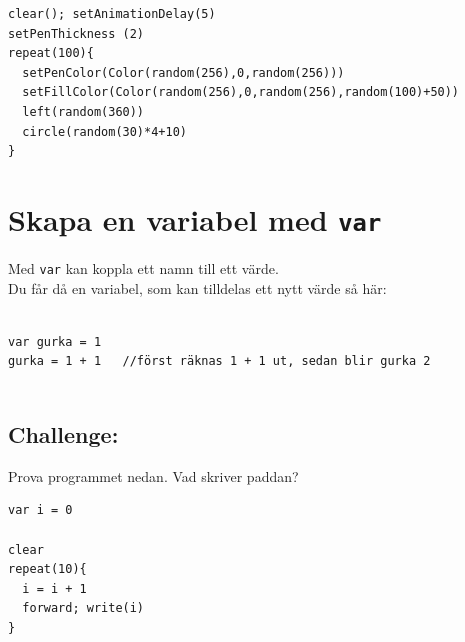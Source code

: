   

\begin{lstlisting}[basicstyle={\ttfamily\fontsize{16}{19}\selectfont},numbers=none]
clear(); setAnimationDelay(5)
setPenThickness (2)
repeat(100){
  setPenColor(Color(random(256),0,random(256)))
  setFillColor(Color(random(256),0,random(256),random(100)+50))
  left(random(360))
  circle(random(30)*4+10)
}
\end{lstlisting}
        
\chapter{Skapa en variabel med \lstinline{var}}Med \lstinline{var} kan koppla ett namn till ett värde.\\
Du får då en variabel, som kan tilldelas ett nytt värde så här:

\begin{lstlisting}[numbers=none]

var gurka = 1
gurka = 1 + 1   //först räknas 1 + 1 ut, sedan blir gurka 2        
        
\end{lstlisting}
        
\section*{\color{BrickRed}Challenge:}
Prova programmet nedan. Vad skriver paddan?

\begin{lstlisting}[basicstyle={\ttfamily\fontsize{16}{19}\selectfont},numbers=none]
var i = 0

clear
repeat(10){
  i = i + 1
  forward; write(i)
}
\end{lstlisting}
        
